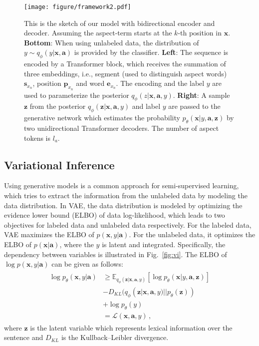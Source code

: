 \documentclass[11pt,a4paper]{article}
\begin{document}
\begin{figure*}
	\centering
	\texttt{[image: figure/framework2.pdf]}
	\caption{This is the sketch of our model with bidirectional encoder and decoder. Assuming the aspect-term starts at the $k$-th position in $\mathbf{x}$.
		{\bf Bottom}: When using unlabeled data, the distribution of $y\sim q_\phi(y|\mathbf{x}, \mathbf{a})$ is provided by the classifier.
		{\bf Left}: The sequence is encoded by a Transformer block, which receives the summation of three embeddings, i.e., segment (used to distinguish aspect words) $\mathbf{s}_{x_n}$, position $\mathbf{p}_{x_n}$ and word $\mathbf{e}_{x_n}$. The encoding and the label $y$ are used to parameterize the posterior $q_\phi(z|\textbf{x},\mathbf{a},y)$.
		{\bf Right}: A sample $\mathbf{z}$ from the posterior $q_\phi(\mathbf{z}|\mathbf{x}, \mathbf{a}, y)$ and label $y$ are passed to the generative network which estimates the probability $p_\theta(\mathbf{x}|y, \mathbf{a}, \mathbf{z})$ by two unidirectional Transformer decoders. The number of aspect tokens is $l_a$.
	}
	\label{fig:framework}
\end{figure*}

\subsection{Variational Inference}
\label{sec:vi}
Using generative models is a common approach for semi-supervised learning, which tries to extract the information from the unlabeled data by modeling the data distribution.
In VAE, the data distribution is modeled by optimizing the evidence lower bound (ELBO) of data log-likelihood, which leads to two objectives for labeled data and unlabeled data respectively.
For the labeled data, VAE maximizes the ELBO of $p(\mathbf{x},y|\mathbf{a})$. For the unlabeled data, it optimizes the ELBO of $p(\mathbf{x}|\mathbf{a})$, where the $y$ is latent and integrated.
Specifically, the dependency between variables is illustrated in Fig.~\ref{fig:vi}.
The ELBO of $\log p(\mathbf{x},y|\mathbf{a})$ can be given as follows:
\begin{eqnarray}
\begin{split}
\log p_{\theta}(\mathbf{x}, y|\mathbf{a}) & \ge \mathbb{E}_{q_{\phi}(\mathbf{z}|\mathbf{x},\mathbf{a},y)}[\log p_{\theta}(\mathbf{x}|y, \mathbf{a}, \mathbf{z})] \\ 
& - D_{KL}(q_{\phi}(\mathbf{z}|\mathbf{x},\mathbf{a},y) || p_\theta(\mathbf{z})) \\
& + \log p_\theta(y) \\
& = \mathcal{L}(\mathbf{x}, \mathbf{a}, y) \,,
\end{split}
\label{equ:lab}
\end{eqnarray}
where $\mathbf{z}$ is the latent variable which represents lexical information over the sentence and $D_{KL}$ is the Kullback–Leibler divergence.
\end{document}
